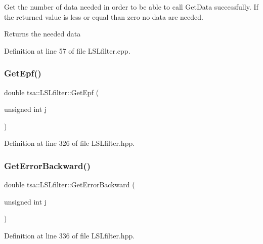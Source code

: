 Get the number of data needed in order to be able to call Get\+Data successfully. If the returned value is less or equal than zero no data are needed.

\begin{DoxyReturn}{Returns}
the needed data 
\end{DoxyReturn}


Definition at line 57 of file L\+S\+Lfilter.\+cpp.

\mbox{\label{classtsa_1_1_l_s_lfilter_a94d29deb2900d3be889b1288730112df}} 
\subsubsection{\texorpdfstring{Get\+Epf()}{GetEpf()}}
{\footnotesize\ttfamily double tsa\+::\+L\+S\+Lfilter\+::\+Get\+Epf (\begin{DoxyParamCaption}\item[{unsigned int}]{j }\end{DoxyParamCaption})\hspace{0.3cm}{\ttfamily [inline]}}



Definition at line 326 of file L\+S\+Lfilter.\+hpp.

\mbox{\label{classtsa_1_1_l_s_lfilter_ad9c27bb102a3cd25ceda75ab5bed4a7a}} 
\subsubsection{\texorpdfstring{Get\+Error\+Backward()}{GetErrorBackward()}}
{\footnotesize\ttfamily double tsa\+::\+L\+S\+Lfilter\+::\+Get\+Error\+Backward (\begin{DoxyParamCaption}\item[{unsigned int}]{j }\end{DoxyParamCaption})\hspace{0.3cm}{\ttfamily [inline]}}



Definition at line 336 of file L\+S\+Lfilter.\+hpp.

